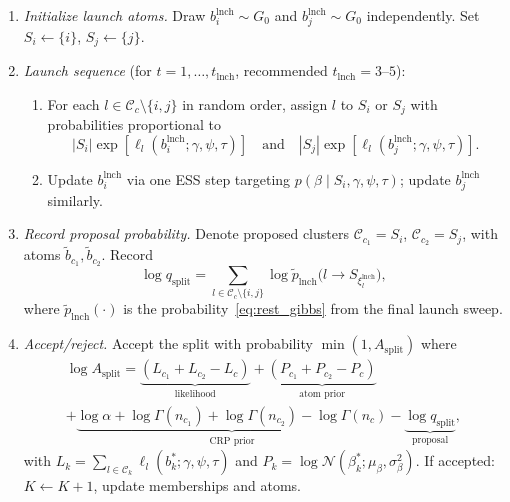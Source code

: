 \documentclass[12pt, a4paper]{article}
\theoremstyle{remark}
\newcommand{\Nor}{\mathcal{N}}
\begin{document}
\begin{enumerate}[leftmargin=*, itemsep=4pt]
  \item \textit{Initialize launch atoms.}
        Draw $b_i^{\mathrm{lnch}} \sim G_0$ and
        $b_j^{\mathrm{lnch}} \sim G_0$ independently.
        Set $S_i \leftarrow \{i\}$, $S_j \leftarrow \{j\}$.

  \item \textit{Launch sequence} (for $t = 1,\ldots,t_{\mathrm{lnch}}$,
        recommended $t_{\mathrm{lnch}} = 3$--$5$):
        \begin{enumerate}[label=(\alph*), itemsep=2pt]
          \item For each $l \in \mathcal{C}_c \setminus \{i,j\}$ in
                random order, assign $l$ to $S_i$ or $S_j$ with
                probabilities proportional to
                \begin{equation}
                  |S_i|\exp[\ell_l(b_i^{\mathrm{lnch}};\gamma,\psi,\tau)]
                  \quad\text{and}\quad
                  |S_j|\exp[\ell_l(b_j^{\mathrm{lnch}};\gamma,\psi,\tau)].
                \label{eq:rest_gibbs}
                \end{equation}
          \item Update $b_i^{\mathrm{lnch}}$ via one ESS step
                targeting $p(\beta \mid S_i, \gamma,\psi,\tau)$;
                update $b_j^{\mathrm{lnch}}$ similarly.
        \end{enumerate}

  \item \textit{Record proposal probability.}
        Denote proposed clusters $\mathcal{C}_{c_1} = S_i$,
        $\mathcal{C}_{c_2} = S_j$, with atoms
        $\tilde b_{c_1}, \tilde b_{c_2}$.  Record
        \begin{equation}
          \log q_{\mathrm{split}}
          = \sum_{l\in\mathcal{C}_c\setminus\{i,j\}}
            \log\tilde p_{\mathrm{lnch}}\!\bigl(l \to S_{\xi_l^{\mathrm{lnch}}}\bigr),
        \label{eq:q_split}
        \end{equation}
        where $\tilde p_{\mathrm{lnch}}(\cdot)$ is the
        probability~\eqref{eq:rest_gibbs} from the final launch sweep.

  \item \textit{Accept/reject.}
        Accept the split with probability $\min(1, A_{\mathrm{split}})$
        where
        \begin{multline}
          \log A_{\mathrm{split}}
          = \underbrace{(L_{c_1} + L_{c_2} - L_c)}_{\text{likelihood}}
            + \underbrace{(P_{c_1} + P_{c_2} - P_c)}_{\text{atom prior}}\\
            + \underbrace{\log\alpha + \log\Gamma(n_{c_1}) + \log\Gamma(n_{c_2})
              - \log\Gamma(n_c)}_{\text{CRP prior}}
            - \underbrace{\log q_{\mathrm{split}}}_{\text{proposal}},
        \label{eq:A_split}
        \end{multline}
        with $L_k = \sum_{l\in\mathcal{C}_k}\ell_l(b_k^*;\gamma,\psi,\tau)$
        and $P_k = \log\Nor(\beta_k^*;\mu_\beta,\sigma_\beta^2)$.
        If accepted: $K \leftarrow K+1$, update memberships and atoms.
\end{enumerate}
\end{document}
